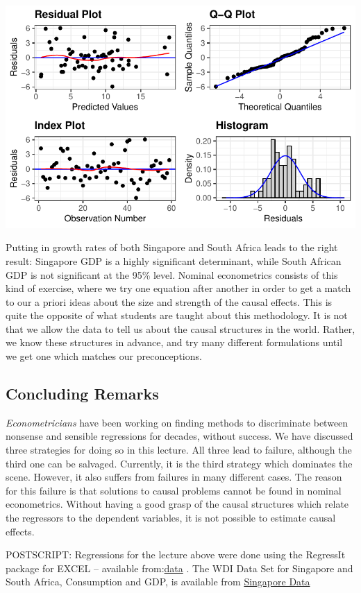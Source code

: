 \documentclass[
  letterpaper,
  DIV=11,
  numbers=noendperiod]{scrartcl}
\begin{document}
\includegraphics{Spurious-Regressions_files/figure-pdf/unnamed-chunk-10-2.pdf}

Putting in growth rates of both Singapore and South Africa leads to the
right result: Singapore GDP is a highly significant determinant, while
South African GDP is not significant at the 95\% level. Nominal
econometrics consists of this kind of exercise, where we try one
equation after another in order to get a match to our a priori ideas
about the size and strength of the causal effects. This is quite the
opposite of what students are taught about this methodology. It is not
that we allow the data to tell us about the causal structures in the
world. Rather, we know these structures in advance, and try many
different formulations until we get one which matches our
preconceptions.

\hypertarget{concluding-remarks}{%
\subsection{Concluding Remarks}\label{concluding-remarks}}

\emph{Econometricians} have been working on finding methods to
discriminate between nonsense and sensible regressions for decades,
without success. We have discussed three strategies for doing so in this
lecture. All three lead to failure, although the third one can be
salvaged. Currently, it is the third strategy which dominates the scene.
However, it also suffers from failures in many different cases. The
reason for this failure is that solutions to causal problems cannot be
found in nominal econometrics. Without having a good grasp of the causal
structures which relate the regressors to the dependent variables, it is
not possible to estimate causal effects.

POSTSCRIPT: Regressions for the lecture above were done using the
RegressIt package for EXCEL -- available
from:\href{https://regressit.com/}{data} . The WDI Data Set for
Singapore and South Africa, Consumption and GDP, is available from
\href{https://onedrive.live.com/view.aspx?resid=F5F6A4108BE920A5!46844\&ithint=file\%2cxlsx\&authkey=!AA5r8iTFTqYaIfU}{Singapore
Data}
\end{document}

